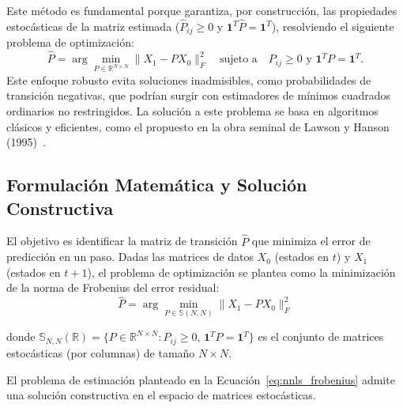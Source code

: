 Este método es fundamental porque garantiza, por construcción, las propiedades estocásticas de la matriz estimada ($\hat{P}_{ij} \geq 0$ y $\mathbf{1}^T \hat{P} = \mathbf{1}^T$), resolviendo el siguiente problema de optimización:
\begin{equation}
\hat{P} = \arg\min_{P \in \mathbb{R}^{N \times N}} \| X_1 - P X_0 \|_F^2 \quad \text{sujeto a} \quad P_{ij} \geq 0 \text{ y } \mathbf{1}^T P = \mathbf{1}^T.
\label{eq:nnls_optim_formal}
\end{equation}
Este enfoque robusto evita soluciones inadmisibles, como probabilidades de transición negativas, que podrían surgir con estimadores de mínimos cuadrados ordinarios no restringidos. La solución a este problema se basa en algoritmos clásicos y eficientes, como el propuesto en la obra seminal de Lawson y Hanson (1995)~\cite{LawsonHanson1995}.


\subsection{Formulación Matemática y Solución Constructiva}

El objetivo es identificar la matriz de transición \(\hat{P}\) que minimiza el error de predicción en un paso. Dadas las matrices de datos \(X_0\) (estados en \(t\)) y \(X_1\) (estados en \(t+1\)), el problema de optimización se plantea como la minimización de la norma de Frobenius del error residual:
\begin{equation}
\hat{P} = \arg\min_{P \in \mathbb{S}(N,N)} \| X_1 - P X_0 \|_F^2
\label{eq:nnls_frobenius}
\end{equation}

donde \(\mathbb{S}_{N,N}(\mathbb{R}) = \{P \in \mathbb{R}^{N \times N} : P_{ij} \geq 0,\, \mathbf{1}^T P = \mathbf{1}^T \}\) es el conjunto de matrices estocásticas (por columnas) de tamaño \(N \times N\).

\begin{corollary}
\label{cor:existencia_p_hat_constructivo}
El problema de estimación planteado en la Ecuación~\ref{eq:nnls_frobenius} admite una solución constructiva en el espacio de matrices estocásticas.
\end{corollary}

